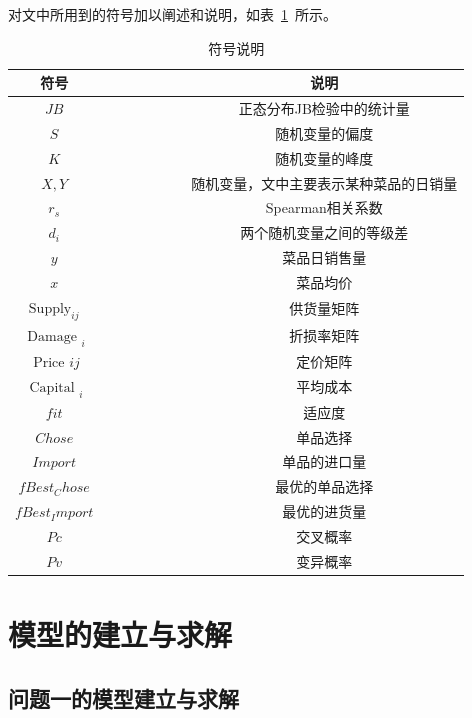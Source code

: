 \documentclass{cumcmthesis}
\begin{document}
对文中所用到的符号加以阐述和说明，如表~\ref{tab001}~所示。
\begin{table}[!htbp]
	\caption{符号说明}\label{tab001} \centering
	\begin{tabular}{cccccccc}
		\toprule[1.5pt]
		符号 &  &  &  &  &  &  & 说明\\
		\midrule[1pt]
		$JB$ &  &  &  &  &  &  & 正态分布JB检验中的统计量\\
		$S$ &  &  &  &  &  &  & 随机变量的偏度\\
		$K$ &  &  &  &  &  &  & 随机变量的峰度\\
		$X,Y$ &  &  &  &  &  &  & 随机变量，文中主要表示某种菜品的日销量\\
		$r_s$ &  &  &  &  &  &  & Spearman相关系数\\
		$d_i$ &  &  &  &  &  &  & 两个随机变量之间的等级差\\
		$y$ &  &  &  &  &  &  & 菜品日销售量\\
		$x$ &  &  &  &  &  &  & 菜品均价\\
		$\text{Supply}_{i j}$ &  &  &  &  &  &  & 供货量矩阵\\
		$\text { Damage }_i$ &  &  &  &  &  &  & 折损率矩阵\\
		$\text { Price } i j$ &  &  &  &  &  &  & 定价矩阵\\
		$\text { Capital }_i$ &  &  &  &  &  &  & 平均成本\\
		$fit$ &  &  &  &  &  &  & 适应度\\
		$Chose$ &  &  &  &  &  &  & 单品选择\\
		$Import$ &  &  &  &  &  &  & 单品的进口量\\
		$fBest_Chose$ &  &  &  &  &  &  & 最优的单品选择\\
		$fBest_Import$ &  &  &  &  &  &  & 最优的进货量\\
		$Pc$ &  &  &  &  &  &  & 交叉概率\\
		$Pv$ &  &  &  &  &  &  & 变异概率\\
		\bottomrule[1.5pt]
	\end{tabular}
\end{table}

\section{模型的建立与求解}

\subsection{问题一的模型建立与求解}
\end{document}

